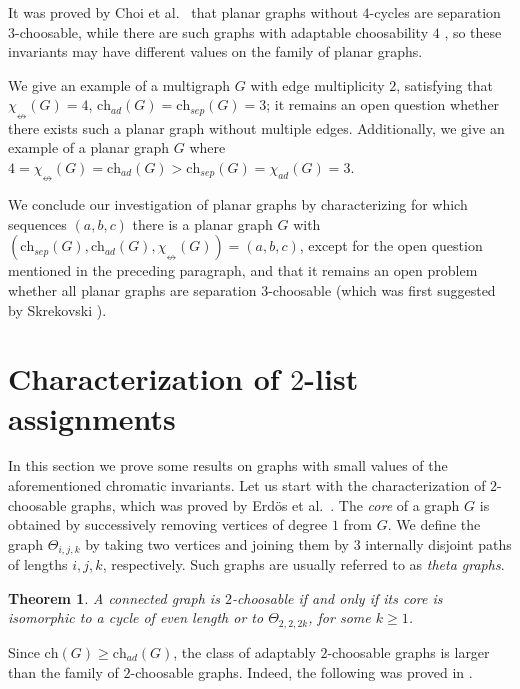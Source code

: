 \documentclass[12pt]{article}
\newtheorem{theorem}{Theorem}[section]
\newcommand{\single}{\chi_{\nleftrightarrow}}
\newcommand{\ch}{\mathrm{ch}}
\begin{document}
It was proved by Choi et al.\ \cite{Choi} that planar graphs 
without $4$-cycles are separation $3$-choosable,
while there are such graphs with adaptable choosability $4$ \cite{EsperetMontassierZhu}, 
so these invariants
may have different values on the family of planar graphs. 

We give an example of a multigraph $G$ with edge multiplicity
$2$, satisfying that $\single(G) = 4$,
$\ch_{ad}(G)=\ch_{sep}(G)=3$; it remains an open question whether
there exists such a planar graph without multiple edges.
Additionally, we give an example of a planar graph $G$ where
$4=\single(G) = \ch_{ad}(G) > \ch_{sep}(G) = \chi_{ad}(G) =3$.


We conclude our investigation of planar graphs by characterizing for which sequences $(a,b,c)$
there is a planar graph $G$ with $(\ch_{sep}(G), \ch_{ad}(G), \single(G))=(a,b,c)$, except for the open question
mentioned in 
the preceding paragraph, and
that it remains an open problem whether all planar graphs 
are separation $3$-choosable (which was first suggested by Skrekovski
\cite{Skrekovski}).







	


\section{Characterization of $2$-list assignments}

In this section we prove some results on graphs with small values of the aforementioned
chromatic invariants.
Let us start with the characterization of $2$-choosable graphs, which was proved by
Erdös et al.\ \cite{ERT}. The {\em core} of a graph $G$ is obtained by successively removing
vertices of degree $1$ from  $G$. We define the graph $\Theta_{i,j,k}$ by taking two
vertices and joining them by $3$ internally disjoint paths of lengths $i,j,k$, respectively. Such graphs are
usually referred to as {\em theta graphs}.

\begin{theorem}
\label{th:2choosable} \cite{ERT}
	A connected graph is $2$-choosable if and only if its core is isomorphic to a 
	cycle of even length or
	to $\Theta_{2,2,2k}$, for some $k \geq 1$.
\end{theorem}

Since $\ch(G) \geq \ch_{ad}(G)$, the class of adaptably $2$-choosable graphs is larger
than the family of $2$-choosable graphs. 
Indeed, the following was proved in \cite{KostochkaZhu}.
\end{document}
